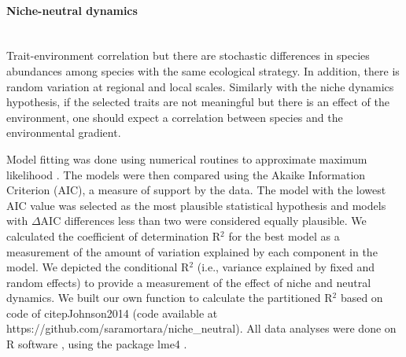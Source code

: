 \documentclass[12pt]{article}
\begin{document}
\begin{mdframed}[style=exampledefault]
\begin{singlespacing}
\paragraph{{\color{nineu}{$\blacksquare$}} Niche-neutral dynamics} ~\\ Trait-environment correlation but there are stochastic differences in species abundances among species with the same ecological strategy. In addition, 
there is random variation at regional and local scales. Similarly with the niche dynamics hypothesis, if the selected traits are not meaningful but there is an effect of the environment, one should expect a correlation between species and the environmental gradient.    

\end{singlespacing}

\end{mdframed}

Model fitting was done using numerical routines to approximate maximum
likelihood \citep{Bates2013}. The models were then compared using the
Akaike Information Criterion (AIC), a measure of support by the data. 
The model with the lowest AIC value was selected as the most plausible
statistical hypothesis and models with {$\Delta$}AIC differences less
than two were considered equally plausible. We calculated the coefficient of determination R${^2}$ \citep{Nakagawa2013, Johnson2014} for the best model as a measurement of the amount of variation explained by each component in the model. We depicted the conditional R${^2}$ (i.e., variance explained by fixed and random effects) to provide a measurement of the effect of niche and neutral dynamics. We built our own function to calculate the partitioned R${^2}$ based on code of citep{Johnson2014} (code available at https://github.com/saramortara/niche\_neutral).
All data analyses were done on R software \citep{RCoreDevelopmentTeam2009}, using the package lme4 \citep{Bates2013}.
\end{document}
